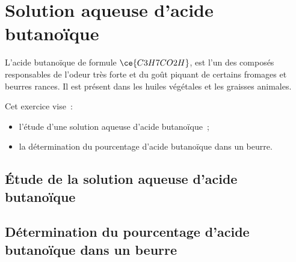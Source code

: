\section{Solution aqueuse d'acide butanoïque}
L'acide butanoïque de formule $\ce{C3H7CO2H}$, est l'un des composés
responsables de l'odeur très forte et du goût piquant de certains fromages et
beurres rances.  Il est présent dans les huiles végétales et les graisses
animales.

Cet exercice vise~:
\begin{itemize}
    \item l'étude d'une solution aqueuse d'acide butanoïque~;
    \item la détermination du pourcentage d'acide butanoïque dans un beurre.
\end{itemize}

\subsection{Étude de la solution aqueuse d'acide butanoïque}

          
\subsection{Détermination du pourcentage d'acide butanoïque dans un beurre}


